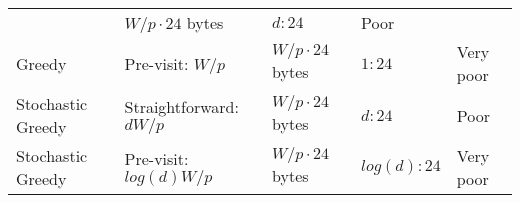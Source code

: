 \documentclass[10pt,oneside]{memoir}
\begin{document}
\begin{longtable}[]{@{}lllll@{}}
\begin{minipage}[t]{0.23\columnwidth}
\end{minipage} & \begin{minipage}[t]{0.17\columnwidth}\raggedright
\(W/p \cdot 24\) bytes\strut
\end{minipage} & \begin{minipage}[t]{0.16\columnwidth}\raggedright
\(d : 24\)\strut
\end{minipage} & \begin{minipage}[t]{0.12\columnwidth}\raggedright
Poor\strut
\end{minipage}\tabularnewline
\begin{minipage}[t]{0.18\columnwidth}\raggedright
Greedy\strut
\end{minipage} & \begin{minipage}[t]{0.23\columnwidth}\raggedright
Pre-visit: \(W/p\)\strut
\end{minipage} & \begin{minipage}[t]{0.17\columnwidth}\raggedright
\(W/p \cdot 24\) bytes\strut
\end{minipage} & \begin{minipage}[t]{0.16\columnwidth}\raggedright
\(1 : 24\)\strut
\end{minipage} & \begin{minipage}[t]{0.12\columnwidth}\raggedright
Very poor\strut
\end{minipage}\tabularnewline
\begin{minipage}[t]{0.18\columnwidth}\raggedright
Stochastic Greedy\strut
\end{minipage} & \begin{minipage}[t]{0.23\columnwidth}\raggedright
Straightforward: \(dW/p\)\strut
\end{minipage} & \begin{minipage}[t]{0.17\columnwidth}\raggedright
\(W/p \cdot 24\) bytes\strut
\end{minipage} & \begin{minipage}[t]{0.16\columnwidth}\raggedright
\(d : 24\)\strut
\end{minipage} & \begin{minipage}[t]{0.12\columnwidth}\raggedright
Poor\strut
\end{minipage}\tabularnewline
\begin{minipage}[t]{0.18\columnwidth}\raggedright
Stochastic Greedy\strut
\end{minipage} & \begin{minipage}[t]{0.23\columnwidth}\raggedright
Pre-visit: \(log(d)W/p\)\strut
\end{minipage} & \begin{minipage}[t]{0.17\columnwidth}\raggedright
\(W/p \cdot 24\) bytes\strut
\end{minipage} & \begin{minipage}[t]{0.16\columnwidth}\raggedright
\(log(d) : 24\)\strut
\end{minipage} & \begin{minipage}[t]{0.12\columnwidth}\raggedright
Very poor\strut
\end{minipage}\tabularnewline
\bottomrule
\end{longtable}
\end{document}
